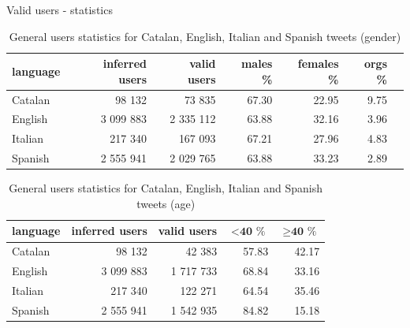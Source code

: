 \documentclass[9pt,aspectratio=1610]{beamer}  %
\begin{document}
\begin{frame}{Valid users - statistics}

    \begin{table}[h]
    	\centering
    	\begin{tabular}{lrrrrrr}
    		\toprule
    		\textbf{language} & \textbf{inferred users} & \textbf{valid users} & \textbf{males \%} & \textbf{females \%} & \textbf{orgs \%}
    		\\
    		\midrule
    		Catalan & 98 132 & 73 835 & 67.30 & 22.95 & 9.75
    		\\
    		English & 3 099 883 & 2 335 112 & 63.88 & 32.16 & 3.96 
    		\\
    		Italian & 217 340 & 167 093 & 67.21 & 27.96 & 4.83 
    		\\
    		Spanish & 2 555 941 & 2 029 765 & 63.88 & 33.23 & 2.89 
    		\\
    		\bottomrule
    	\end{tabular}
    	\caption{General users statistics for Catalan, English, Italian and Spanish tweets (gender)}
    	\label{tab:users-languages}
    \end{table}
    
    \begin{table}[h]
    	\centering
    	\begin{tabular}{lrrrr}
    		\toprule
    		\textbf{language} & \textbf{inferred users} & \textbf{valid users} & \(< \textbf{40 \%}\) & \(\geq \textbf{40 \%}\) 
    		\\
    		\midrule
    		Catalan & 98 132 & 42 383 & 57.83 & 42.17
    		\\
    		English & 3 099 883 & 1 717 733 & 68.84 & 33.16 
    		\\
    		Italian & 217 340 & 122 271 & 64.54 & 35.46 
    		\\
    		Spanish & 2 555 941 & 1 542 935 & 84.82 & 15.18
    		\\
    		\bottomrule
    	\end{tabular}
    	\caption{General users statistics for Catalan, English, Italian and Spanish tweets (age)}
    	\label{tab:users-age}
    \end{table}
    
\end{frame}
\end{document}
